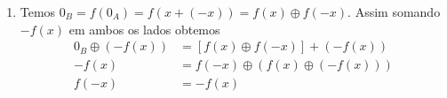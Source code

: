 \documentclass{beamer}
\begin{document}
    \begin{frame}
        \begin{enumerate}[label={\roman*})]
            \conti
            \item Temos $0_B = f(0_A) = f(x + (-x)) = f(x)\oplus f(-x)$. Assim somando $-f(x)$ em ambos os lados obtemos
            \begin{align*}
                0_B\oplus(-f(x)) &= [f(x)\oplus f(-x)] + (-f(x))\\
                -f(x) &= f(-x) \oplus (f(x) \oplus (-f(x)))\\
                f(-x) &= -f(x)
            \end{align*}
        \end{enumerate}
    \end{frame}
\end{document}
